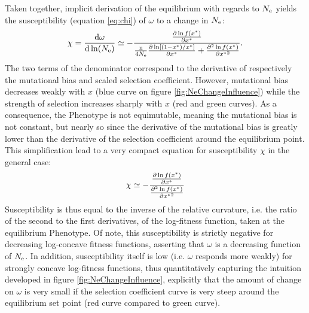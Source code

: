 Taken together, implicit derivation of the equilibrium with regards to $N_{\mathrm{e}}$ yields the susceptibility (equation \ref{eq:chi}) of $\omega$ to a change in $N_{\mathrm{e}}$:
\begin{gather}
 \chi = \frac{ \mathrm{d} \omega}{\mathrm{d} \ln (N_{\mathrm{e}})} \simeq - \frac{\frac{ \partial \ln f(x^{*}) }{\partial {x^{*}}}}{\frac{\text{n}}{4 N_{\mathrm{e}}} \frac{\partial \ln [ (1 - x^{*}) / x^{*} ]}{\partial x^{*} } + \frac{ \partial^2 \ln f(x^{*}) }{\partial {x^{*}}^2}}.
\end{gather}
The two terms of the denominator correspond to the derivative of respectively the mutational bias and scaled selection coefficient.
However, mutational bias decreases weakly with $x$ (blue curve on figure \ref{fig:NeChangeInfluence}) while the strength of selection increases sharply with $x$ (red and green curves).
As a consequence, the \gls{Phenotype} is not equimutable, meaning the mutational bias is not constant, but nearly so since the derivative of the mutational bias is greatly lower than the derivative of the selection coefficient around the equilibrium point. 
This simplification lead to a very compact equation for susceptibility $\chi$ in the general case: 
\begin{gather}
\chi \simeq - \frac{\frac{ \partial \ln f(x^{*}) }{\partial {x^{*}}}}{\frac{ \partial^2 \ln f(x^{*}) }{\partial {x^{*}}^2}}
\end{gather}
Susceptibility is thus equal to the inverse of the relative curvature, i.e. the ratio of the second to the first derivatives, of the log-fitness function, taken at the equilibrium \gls{Phenotype}.
Of note, this susceptibility is strictly negative for decreasing log-concave fitness functions, asserting that $\omega$ is a decreasing function of $N_{\mathrm{e}}$.
In addition, susceptibility itself is low (i.e. $\omega$ responds more weakly) for strongly concave log-fitness functions, thus quantitatively capturing the intuition developed in figure \ref{fig:NeChangeInfluence}, explicitly that the amount of change on $\omega$ is very small if the selection coefficient curve is very steep around the equilibrium set point (red curve compared to green curve).

